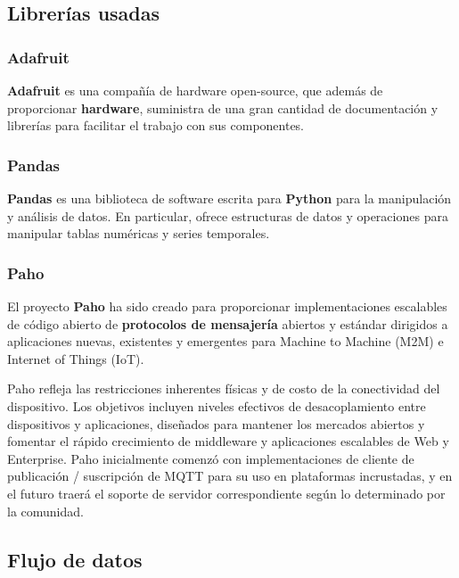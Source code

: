 	\subsection{Librerías usadas}
		\subsubsection{Adafruit}
		\textbf{Adafruit} es una compañía de hardware open-source, que además de proporcionar \textbf{hardware}, suministra de una gran cantidad de documentación y librerías para facilitar el trabajo con sus componentes.
		
		\subsubsection{Pandas}
		\textbf{Pandas} es una biblioteca de software escrita para \textbf{Python} para la manipulación y análisis de datos. En particular, ofrece estructuras de datos y operaciones para manipular tablas numéricas y series temporales.
		
		\subsubsection{Paho}
		El proyecto \textbf{Paho} ha sido creado para proporcionar implementaciones escalables de código abierto de \textbf{protocolos de mensajería} abiertos y estándar dirigidos a aplicaciones nuevas, existentes y emergentes para Machine to Machine (M2M) e Internet of Things (IoT).
		
		Paho refleja las restricciones inherentes físicas y de costo de la conectividad del dispositivo. Los objetivos incluyen niveles efectivos de desacoplamiento entre dispositivos y aplicaciones, diseñados para mantener los mercados abiertos y fomentar el rápido crecimiento de middleware y aplicaciones escalables de Web y Enterprise. Paho inicialmente comenzó con implementaciones de cliente de publicación / suscripción de MQTT para su uso en plataformas incrustadas, y en el futuro traerá el soporte de servidor correspondiente según lo determinado por la comunidad.
		
	\subsection{Flujo de datos}